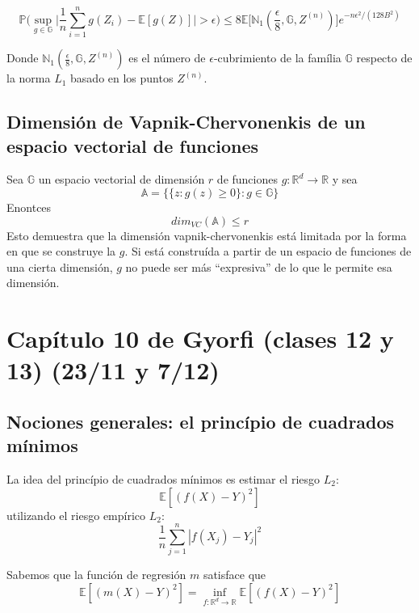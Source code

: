 \documentclass[12pt, a4paper]{article}
\begin{document}
$$
\mathds{P}\Bigg( \mathop{sup}_{g\in\mathds{G}} \big| \frac{1}{n} \sum_{i=1}^n g(Z_i) - \mathds{E}[g(Z)] \big| >\epsilon \Bigg)
\leq
8\mathds{E}\Bigg[ \mathds{N}_1(\frac{\epsilon}{8},\mathds{G},Z^{(n)}) \Bigg] e^{-n\epsilon^2/(128B^2)}
$$

Donde $ \mathds{N}_1(\frac{\epsilon}{8},\mathds{G},Z^{(n)}) $ es el número de $\epsilon$-cubrimiento de la família $\mathds{G}$ respecto de la norma $L_1$ basado en los puntos $Z^{(n)}$.
\subsection{Dimensión de Vapnik-Chervonenkis de un espacio vectorial de funciones}
Sea $\mathds{G}$ un espacio vectorial de dimensión $r$  de funciones $g:\mathds{R}^d\rightarrow\mathds{R}$ y sea $$\mathds{A}=\Big\{ \{ z:g(z)\geq 0 \} : g\in\mathds{G}\Big\}$$
Enontces $$dim_{VC}(\mathds{A})\leq r$$
Esto demuestra que la dimensión vapnik-chervonenkis está limitada por la forma en que se construye la $g$. Si está construída a partir de un espacio de funciones de una cierta dimensión, $g$ no puede ser más ``expresiva'' de lo que le permite esa dimensión.


\section{Capítulo 10 de Gyorfi (clases 12 y 13) (23/11 y 7/12)}
\subsection{Nociones generales: el princípio de cuadrados mínimos}
La idea del princípio de cuadrados mínimos es estimar el riesgo $L_2$:
$$
\mathds{E}[(f(X)-Y)^2]
$$
utilizando el riesgo empírico $L_2$:
$$
\frac{1}{n} \sum_{j=1}^n | f(X_j) -Y_j |^2
$$

Sabemos que la función de regresión $m$ satisface que 
$$
\mathds{E}[(m(X)-Y)^2] = \mathop{inf}_{f:\mathds{R}^d \rightarrow \mathds{R}} \mathds{E}[(f(X)-Y)^2]
$$
\end{document}
